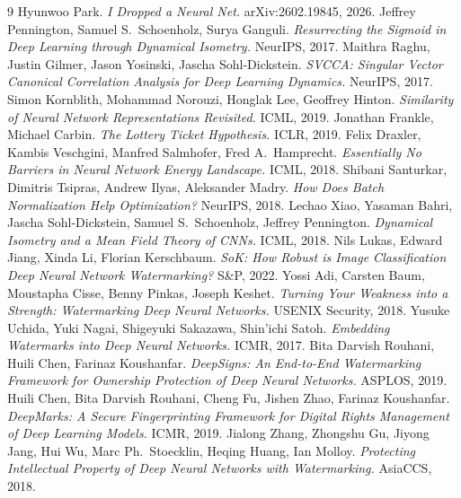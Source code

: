 \documentclass[10pt]{article}
\theoremstyle{remark}
\begin{document}
\begin{thebibliography}{9}
 Hyunwoo Park. \emph{I Dropped a Neural Net.} arXiv:2602.19845, 2026.
 Jeffrey Pennington, Samuel S.\ Schoenholz, Surya Ganguli.
  \emph{Resurrecting the Sigmoid in Deep Learning through Dynamical Isometry.} NeurIPS, 2017.
 Maithra Raghu, Justin Gilmer, Jason Yosinski, Jascha Sohl-Dickstein.
  \emph{SVCCA: Singular Vector Canonical Correlation Analysis for Deep Learning Dynamics.} NeurIPS, 2017.
 Simon Kornblith, Mohammad Norouzi, Honglak Lee, Geoffrey Hinton.
  \emph{Similarity of Neural Network Representations Revisited.} ICML, 2019.
 Jonathan Frankle, Michael Carbin.
  \emph{The Lottery Ticket Hypothesis.} ICLR, 2019.
 Felix Draxler, Kambis Veschgini, Manfred Salmhofer, Fred A.~Hamprecht.
  \emph{Essentially No Barriers in Neural Network Energy Landscape.} ICML, 2018.
 Shibani Santurkar, Dimitris Tsipras, Andrew Ilyas, Aleksander Madry.
  \emph{How Does Batch Normalization Help Optimization?} NeurIPS, 2018.
 Lechao Xiao, Yasaman Bahri, Jascha Sohl-Dickstein, Samuel S.\ Schoenholz, Jeffrey Pennington.
  \emph{Dynamical Isometry and a Mean Field Theory of CNNs.} ICML, 2018.
 Nils Lukas, Edward Jiang, Xinda Li, Florian Kerschbaum.
  \emph{SoK: How Robust is Image Classification Deep Neural Network Watermarking?} S\&P, 2022.
 Yossi Adi, Carsten Baum, Moustapha Cisse, Benny Pinkas, Joseph Keshet.
  \emph{Turning Your Weakness into a Strength: Watermarking Deep Neural Networks.} USENIX Security, 2018.
 Yusuke Uchida, Yuki Nagai, Shigeyuki Sakazawa, Shin'ichi Satoh.
  \emph{Embedding Watermarks into Deep Neural Networks.} ICMR, 2017.
 Bita Darvish Rouhani, Huili Chen, Farinaz Koushanfar.
  \emph{DeepSigns: An End-to-End Watermarking Framework for Ownership Protection of Deep Neural Networks.} ASPLOS, 2019.
 Huili Chen, Bita Darvish Rouhani, Cheng Fu, Jishen Zhao, Farinaz Koushanfar.
  \emph{DeepMarks: A Secure Fingerprinting Framework for Digital Rights Management of Deep Learning Models.} ICMR, 2019.
 Jialong Zhang, Zhongshu Gu, Jiyong Jang, Hui Wu, Marc Ph.\ Stoecklin, Heqing Huang, Ian Molloy.
  \emph{Protecting Intellectual Property of Deep Neural Networks with Watermarking.} AsiaCCS, 2018.

\end{thebibliography}
\end{document}
